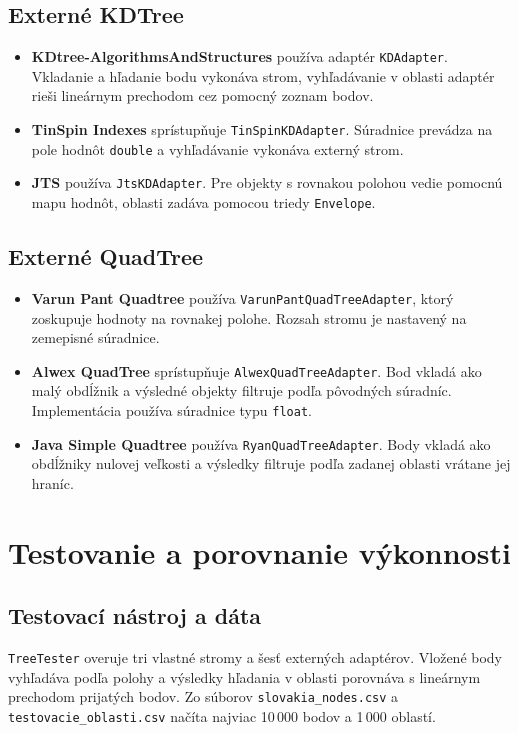 \documentclass[12pt,a4paper,oneside]{report}
\begin{document}
\section{Externé KDTree}
\begin{itemize}[leftmargin=1.5em]
\item \textbf{KDtree-AlgorithmsAndStructures} \cite{externalKd} používa
  adaptér \texttt{KDAdapter}. Vkladanie a hľadanie bodu vykonáva strom,
  vyhľadávanie v oblasti adaptér rieši lineárnym prechodom cez pomocný
  zoznam bodov.
\item \textbf{TinSpin Indexes} \cite{tinspin} sprístupňuje
  \texttt{TinSpinKDAdapter}. Súradnice prevádza na pole hodnôt
  \texttt{double} a vyhľadávanie vykonáva externý strom.
\item \textbf{JTS} \cite{jts} používa \texttt{JtsKDAdapter}.
  Pre objekty s rovnakou polohou vedie pomocnú mapu hodnôt, oblasti
  zadáva pomocou triedy \texttt{Envelope}.
\end{itemize}

\section{Externé QuadTree}
\begin{itemize}[leftmargin=1.5em]
\item \textbf{Varun Pant Quadtree} \cite{varunQuad} používa
  \texttt{VarunPantQuadTreeAdapter}, ktorý zoskupuje hodnoty na rovnakej
  polohe. Rozsah stromu je nastavený na zemepisné súradnice.
\item \textbf{Alwex QuadTree} \cite{alwexQuad} sprístupňuje
  \texttt{AlwexQuadTreeAdapter}. Bod vkladá ako malý obdĺžnik a výsledné
  objekty filtruje podľa pôvodných súradníc. Implementácia používa
  súradnice typu \texttt{float}.
\item \textbf{Java Simple Quadtree} \cite{ryanQuad} používa
  \texttt{RyanQuadTreeAdapter}. Body vkladá ako obdĺžniky nulovej veľkosti
  a výsledky filtruje podľa zadanej oblasti vrátane jej hraníc.
\end{itemize}

\chapter{Testovanie a porovnanie výkonnosti}
\label{chap:testing}

\section{Testovací nástroj a dáta}
\texttt{TreeTester} overuje tri vlastné stromy a šesť externých adaptérov.
Vložené body vyhľadáva podľa polohy a výsledky hľadania v oblasti
porovnáva s lineárnym prechodom prijatých bodov. Zo súborov
\texttt{slovakia\_nodes.csv} a \texttt{testovacie\_oblasti.csv}
načíta najviac 10\,000 bodov a 1\,000 oblastí.
\end{document}
